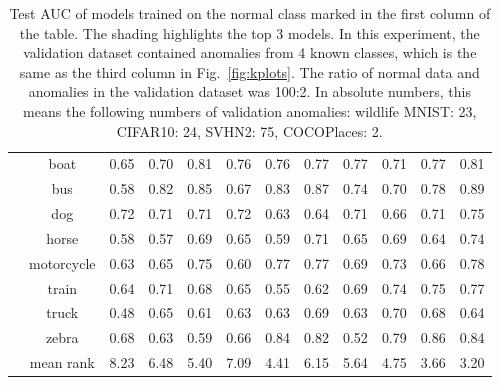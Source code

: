 \begin{table}[ht!]
{\begin{tabular}{c c c c c c c c c c c c }
    & boat & 0.65 & 0.70 & \cellcolor{gray!45} 0.81 & \cellcolor{gray!15} 0.76 & \cellcolor{gray!15} 0.76 & \cellcolor{gray!30} 0.77 & \cellcolor{gray!30} 0.77 & 0.71 & \cellcolor{gray!30} 0.77 & \cellcolor{gray!45} 0.81  \\ 
    & bus & 0.58 & 0.82 & \cellcolor{gray!15} 0.85 & 0.67 & 0.83 & \cellcolor{gray!30} 0.87 & 0.74 & 0.70 & 0.78 & \cellcolor{gray!45} 0.89  \\ 
    & dog & \cellcolor{gray!30} 0.72 & \cellcolor{gray!15} 0.71 & \cellcolor{gray!15} 0.71 & \cellcolor{gray!30} 0.72 & 0.63 & 0.64 & \cellcolor{gray!15} 0.71 & 0.66 & \cellcolor{gray!15} 0.71 & \cellcolor{gray!45} 0.75  \\ 
    & horse & 0.58 & 0.57 & \cellcolor{gray!15} 0.69 & 0.65 & 0.59 & \cellcolor{gray!30} 0.71 & 0.65 & \cellcolor{gray!15} 0.69 & 0.64 & \cellcolor{gray!45} 0.74  \\ 
    & motorcycle & 0.63 & 0.65 & \cellcolor{gray!15} 0.75 & 0.60 & \cellcolor{gray!30} 0.77 & \cellcolor{gray!30} 0.77 & 0.69 & 0.73 & 0.66 & \cellcolor{gray!45} 0.78  \\ 
    & train & 0.64 & 0.71 & 0.68 & 0.65 & 0.55 & 0.62 & 0.69 & \cellcolor{gray!15} 0.74 & \cellcolor{gray!30} 0.75 & \cellcolor{gray!45} 0.77  \\ 
    & truck & 0.48 & 0.65 & 0.61 & 0.63 & 0.63 & \cellcolor{gray!30} 0.69 & 0.63 & \cellcolor{gray!45} 0.70 & \cellcolor{gray!15} 0.68 & 0.64  \\ 
    & zebra & 0.68 & 0.63 & 0.59 & 0.66 & \cellcolor{gray!30} 0.84 & \cellcolor{gray!15} 0.82 & 0.52 & 0.79 & \cellcolor{gray!45} 0.86 & \cellcolor{gray!30} 0.84  \\ 
  \midrule
  & mean rank & 8.23 & 6.48 & 5.40 & 7.09 & \cellcolor{gray!15} 4.41 & 6.15 & 5.64 & 4.75 & \cellcolor{gray!30} 3.66 & \cellcolor{gray!45} 3.20  \\ 
  \bottomrule
 \end{tabular}
 }
 \caption{Test AUC of models trained on the normal class marked in the first column of the table. The shading highlights the top 3 models. In this experiment, the validation dataset contained anomalies from 4 known classes, which is the same as the third column in Fig.~\ref{fig:kplots}. The ratio of normal data and anomalies in the validation dataset was 100:2. In absolute numbers, this means the following numbers of validation anomalies: wildlife MNIST: 23, CIFAR10: 24, SVHN2: 75, COCOPlaces: 2.} 
 \label{tab:loi_ranks_per_ac} 
\end{table}